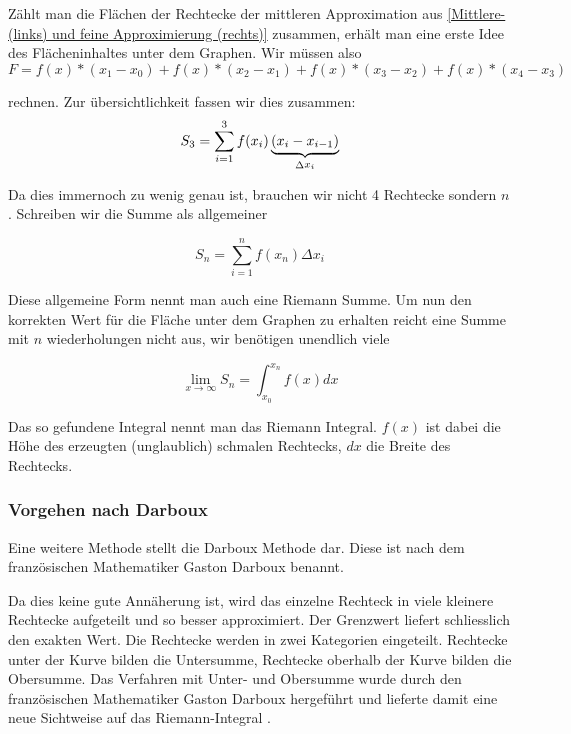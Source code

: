 \documentclass{fhnwreport} %
\begin{document}
\pagebreak

Zählt man die Flächen der Rechtecke der mittleren Approximation aus \ref{Mittlere- (links) und feine Approximierung (rechts)} zusammen, erhält man eine erste Idee des Flächeninhaltes unter dem Graphen. Wir müssen also 
\[
	F = f(x)*(x_1-x_0)+f(x)*(x_2-x_1)+f(x)*(x_3-x_2)+f(x)*(x_4-x_3)
\]

rechnen. Zur übersichtlichkeit fassen wir dies zusammen:
\[
	S_3 = \sum_{i=1}^{3} f(x_i)\underbrace{(x_i-x_{i-1})}_{\substack \Delta x_i}
\]

Da dies immernoch zu wenig genau ist, brauchen wir nicht 4 Rechtecke sondern $n$. Schreiben wir die Summe als allgemeiner

\[
	S_n = \sum_{i=1}^{n} f(x_n)\Delta x_i
\]

Diese allgemeine Form nennt man auch eine Riemann Summe. Um nun den korrekten Wert für die Fläche unter dem Graphen zu erhalten reicht eine Summe mit $n$ wiederholungen nicht aus, wir benötigen unendlich viele

\[
	\lim_{x\to\infty} S_n = \int_{x_0}^{x_n} f(x) dx
\]

Das so gefundene Integral nennt man das Riemann Integral. $f(x)$ ist dabei die Höhe des erzeugten (unglaublich) schmalen Rechtecks, $dx$ die Breite des Rechtecks.

\subsubsection{Vorgehen nach Darboux \cite{Darboux2020}}
Eine weitere Methode stellt die Darboux Methode dar. Diese ist nach dem französischen Mathematiker Gaston Darboux \cite{Darboux2020} benannt.


Da dies keine gute Annäherung ist, wird das einzelne Rechteck in viele kleinere Rechtecke aufgeteilt und so besser approximiert. Der Grenzwert liefert schliesslich den exakten Wert. Die Rechtecke werden in zwei Kategorien eingeteilt. Rechtecke unter der Kurve bilden die Untersumme, Rechtecke oberhalb der Kurve bilden die Obersumme. Das Verfahren mit Unter- und Obersumme wurde durch den französischen Mathematiker Gaston Darboux hergeführt und lieferte damit eine neue Sichtweise auf das Riemann-Integral \cite{Darboux2020}.
\end{document}
